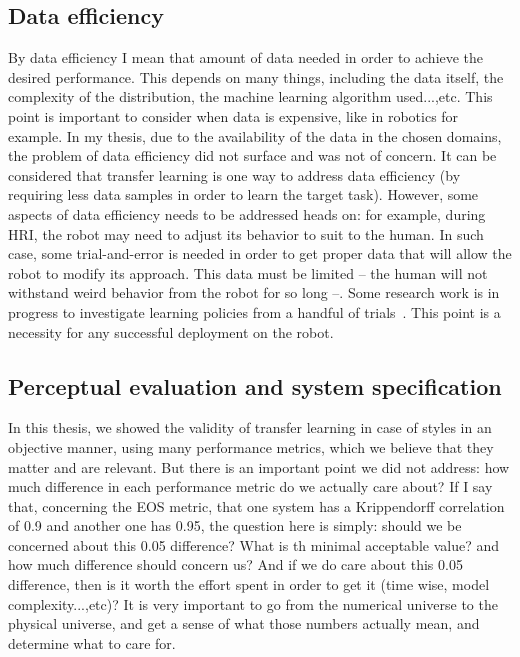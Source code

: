   \subsection{Data efficiency}
    \par By data efficiency I mean that amount of data needed in order to achieve the desired performance. This depends on many things, including the data itself, the complexity of the distribution, the machine learning algorithm used...,etc. This point is important to consider when data is expensive, like in robotics for example. In my thesis, due to the availability of the data in the chosen domains, the problem of data efficiency did not surface and was not of concern. It can be considered that transfer learning is one way to address data efficiency (by requiring less data samples in order to learn the target task). However, some aspects of data efficiency needs to be addressed heads on: for example, during HRI, the robot may need to adjust its behavior to suit to the human. In such case, some trial-and-error is needed in order to get proper data that will allow the robot to modify its approach. This data must be limited -- the human will not withstand weird behavior from the robot for so long --. Some research work is in progress to investigate learning policies from a handful of trials~\citep{cully2015robots,Chatzilygeroudis18}. This point is a necessity for any successful deployment on the robot.

  \subsection{Perceptual evaluation and system specification}
    \par In this thesis, we showed the validity of transfer learning in case of styles in an objective manner, using many performance metrics, which we believe that they matter and are relevant. But there is an important point we did not address: how much difference in each performance metric do we actually care about? If I say that, concerning the EOS metric, that one system has a Krippendorff correlation of 0.9 and another one has 0.95, the question here is simply: should we be concerned about this 0.05 difference? What is th minimal acceptable value? and how much difference should concern us? And if we do care about this 0.05 difference, then is it worth the effort spent in order to get it (time wise, model complexity...,etc)? It is very important to go from the numerical universe to the physical universe, and get a sense of what those numbers actually mean, and determine what to care for.

